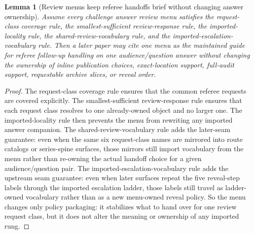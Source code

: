 \documentclass[11pt]{article}
\newtheorem{lemma}{Lemma}
\begin{document}
\begin{lemma}[Review menus keep referee handoffs brief without changing answer ownership]
Assume every challenge answer review menu satisfies the request-class coverage rule, the smallest-sufficient review-response rule, the imported-locality rule, the shared-review-vocabulary rule, and the imported-escalation-vocabulary rule.
Then a later paper may cite one menu as the maintained guide for referee follow-up handling on one audience/question answer without changing the ownership of inline publication choices, exact-location support, full-audit support, requestable archive slices, or reveal order.
\end{lemma}

\begin{proof}
The request-class coverage rule ensures that the common referee requests are covered explicitly.
The smallest-sufficient review-response rule ensures that each request class resolves to one already-owned object and no larger one.
The imported-locality rule then prevents the menu from rewriting any imported answer companion. The shared-review-vocabulary rule adds the later-seam guarantee: even when the same six request-class names are mirrored into route catalogs or series-spine surfaces, those mirrors still import vocabulary from the menu rather than re-owning the actual handoff choice for a given audience/question pair. The imported-escalation-vocabulary rule adds the upstream seam guarantee: even when later surfaces repeat the five reveal-step labels through the imported escalation ladder, those labels still travel as ladder-owned vocabulary rather than as a new menu-owned reveal policy.
So the menu changes only policy packaging: it stabilizes what to hand over for one review request class, but it does not alter the meaning or ownership of any imported rung.\qedhere
\end{proof}
\end{document}
